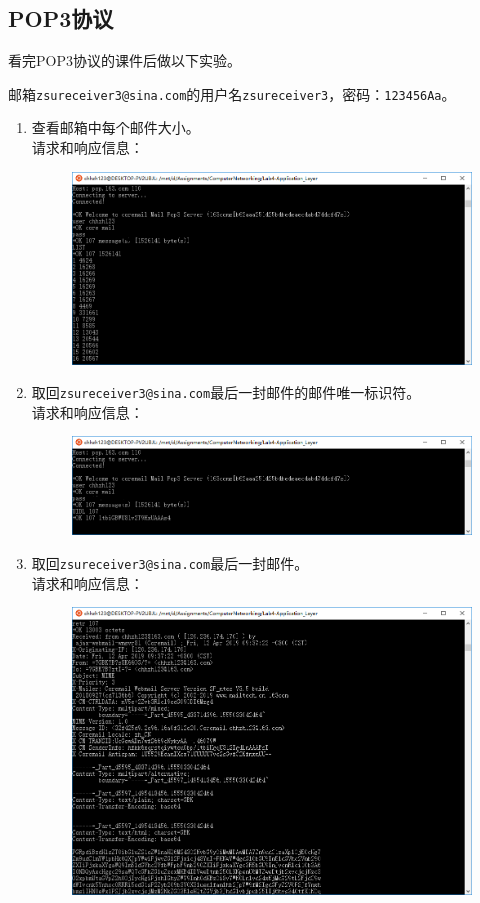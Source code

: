 \documentclass[logo,reportComp]{thesis}
\begin{document}
\subsection{POP3协议}
看完POP3协议的课件后做以下实验。
\par 邮箱\verb'zsureceiver3@sina.com'的用户名\verb'zsureceiver3'，密码：\verb'123456Aa'。
\begin{enumerate}
\item 查看邮箱中每个邮件大小。\\
请求和响应信息：
\begin{figure}[H]
\centering
\includegraphics[width=0.8\linewidth]{fig/pop-1.PNG}
\end{figure}

\item 取回\verb'zsureceiver3@sina.com'最后一封邮件的邮件唯一标识符。\\
请求和响应信息：
\begin{figure}[H]
\centering
\includegraphics[width=0.8\linewidth]{fig/pop-2.PNG}
\end{figure}

\item 取回\verb'zsureceiver3@sina.com'最后一封邮件。\\
请求和响应信息：
\begin{figure}[H]
\centering
\includegraphics[width=0.8\linewidth]{fig/pop-3.PNG}
\end{figure}



\end{enumerate}
\end{document}
